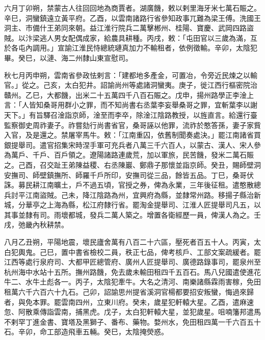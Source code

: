 \begin{pinyinscope}
 六月丁卯朔，禁蒙古人往回回地為商賈者。湖廣饑，敕以剌里海牙米七萬石賑之。辛巳，洞蠻鎮遠立黃平府。乙酉，以雲南諸路行省參知政事兀難為梁王傅。洗國王洞主、市備什王弟同來朝。益江淮行院兵二萬擊郴州、桂陽、寶慶、武岡四路盜賊。以汴梁逃人男女配偶成家，給農具耕種。丙戌，敕：「屯田官以三歲為滿，互於各屯內調用。」宣諭江淮民恃總統璉真加力不輸租者，依例徵輸。辛卯，太陰犯畢。癸巳，以漣、海二州隸山東宣慰司。



 秋七月丙申朔，雲南省參政怯剌言：「建都地多產金，可置冶，令旁近民煉之以輸官。」從之。己亥，太白犯井。詔諭尚州等處諸洞蠻夷。庚子，徙江西行樞密院治贛州。乙巳，大都饑，出米二十五萬四千八百石賑之。戊申，揚州路學正李淦上言：「人皆知桑哥用群小之罪，而不知尚書右丞葉李妄舉桑哥之罪，宜斬葉李以謝天下。」有旨驛召淦詣京師，淦至而李卒，除淦江陰路教授，以旌直言。給還行臺監察御史周祚妻子。祚嘗劾行尚書省官，桑哥誣以他罪，流祚於憨答孫，妻子家貲入官，及是還之。禁屠宰馬牛。敕：「江南重囚，依舊制聞奏處決。」罷江南諸省買銀提舉司。遣官招集宋時涅手軍可充兵者八萬三千六百人，以蒙古、漢人、宋人參為萬戶、千戶、百戶領之。遼陽諸路連歲荒，加以軍旅，民苦饑，發米二萬石賑之。己酉，召交趾王弟陳益稷、右丞陳巖、鄭鼎子那懷並詣京師。癸丑，賜師壁洞安撫司、師壁鎮撫所、師羅千戶所印，安撫司從三品，餘皆五品。丁巳，桑哥伏誅。募民耕江南曠土，戶不過五頃，官授之券，俾為永業，三年後征租。遣憨散總兵討平江南盜賊。己未，降江陰路為州，宜興府為縣，並隸常州路。移揚子縣治新城，分華亭之上海為縣，松江府隸行省。罷淘金提舉司、江淮人匠提舉司凡五，以其事並隸有司。雨壞都城，發兵二萬人築之。增置各衛經歷一員，俾漢人為之。壬戌，弛畿內秋耕禁。



 八月乙丑朔，平陽地震，壞民廬舍萬有八百二十六區，壓死者百五十人。丙寅，太白犯輿鬼。己巳，置中書省檢校二員，秩正七品，俾考核戶、工部文案疏緩者。罷江西等處行泉府司、大都甲匠總管府、廣州人匠提舉司、廣德路錄事司，罷泉州至杭州海中水站十五所。撫州路饑，免去歲未輸田租四千五百石。馬八兒國遣使進花牛二、水牛土彪各一。丙子，太陰犯牽牛。大名之清河、南樂諸縣霖雨害稼，免田租萬六千六百六十九石。己卯，詔諭思州提省溪洞官楊都要招安叛蠻，悔過來歸者，與免本罪。罷雲南四州，立東川府。癸未，歲星犯軒轅大星。乙酉，遣麻速忽、阿散乘傳詣雲南，捕黑虎。戊子，太白犯軒轅大星，並犯歲星。咀喃籓邦遣馬不剌罕丁進金書、寶塔及黑獅子、番布、藥物。婺州水，免田租四萬一千六百五十石。辛卯，命工部造飛車五輛。癸巳，太陰掩熒惑。




\end{pinyinscope}
